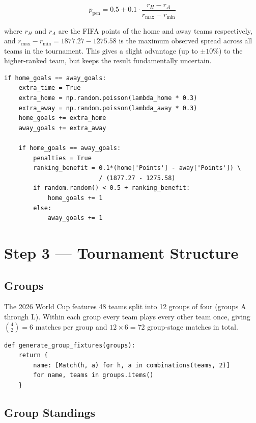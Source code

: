 \documentclass[12pt,a4paper]{article}
\begin{document}
\begin{equation}
  p_{\text{pen}} = 0.5 + 0.1 \cdot
  \frac{r_H - r_A}{r_{\max} - r_{\min}}
  \label{eq:penalty}
\end{equation}

where $r_H$ and $r_A$ are the FIFA points of the home and away teams
respectively, and $r_{\max} - r_{\min} = 1877.27 - 1275.58$ is the
maximum observed spread across all teams in the tournament.  This gives a
slight advantage (up to $\pm 10\%$) to the higher-ranked team, but keeps
the result fundamentally uncertain.

\begin{lstlisting}
if home_goals == away_goals:
    extra_time = True
    extra_home = np.random.poisson(lambda_home * 0.3)
    extra_away = np.random.poisson(lambda_away * 0.3)
    home_goals += extra_home
    away_goals += extra_away

    if home_goals == away_goals:
        penalties = True
        ranking_benefit = 0.1*(home['Points'] - away['Points']) \
                          / (1877.27 - 1275.58)
        if random.random() < 0.5 + ranking_benefit:
            home_goals += 1
        else:
            away_goals += 1
\end{lstlisting}

\section{Step 3 --- Tournament Structure}
\label{sec:tournament}

\subsection{Groups}

The 2026 World Cup features 48 teams split into 12 groups of four (groups
A through L).  Within each group every team plays every other team once,
giving $\binom{4}{2} = 6$ matches per group and $12 \times 6 = 72$
group-stage matches in total.

\begin{lstlisting}
def generate_group_fixtures(groups):
    return {
        name: [Match(h, a) for h, a in combinations(teams, 2)]
        for name, teams in groups.items()
    }
\end{lstlisting}

\subsection{Group Standings}
\end{document}
